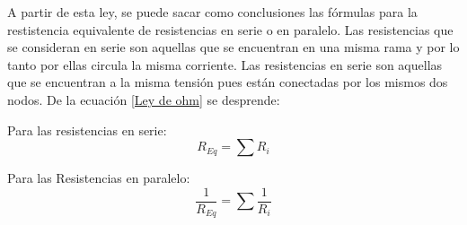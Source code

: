 A partir de esta ley, se puede sacar como conclusiones las fórmulas para la restistencia equivalente de resistencias en serie o en paralelo. Las resistencias que se consideran en serie son aquellas que se encuentran en una misma rama y por lo tanto por ellas circula la misma corriente. Las resistencias en serie son aquellas que se encuentran a la misma tensión pues están conectadas por los mismos dos nodos. De la ecuación \ref{Ley de ohm} se desprende:

Para las resistencias en serie:
\begin{equation}
\label{Ley de ohm}
    R_{Eq} = \sum R_i
\end{equation}

Para las Resistencias en paralelo:
\begin{equation}
\label{Ley de ohm}
   \frac{1}{R_{Eq}}  = \sum \frac{1}{R_i}
\end{equation}


\newpage